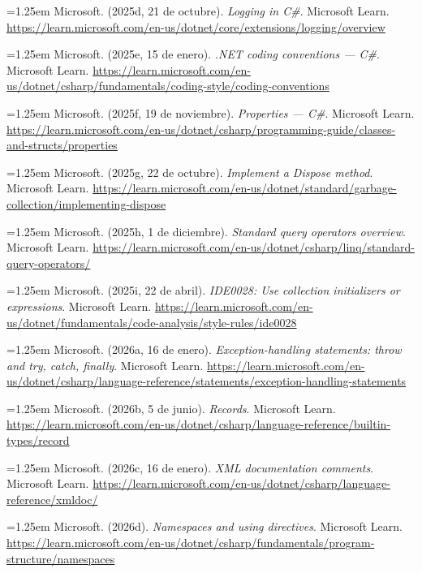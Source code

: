 \smallskip
\noindent\hangindent=1.25em Microsoft. (2025d, 21 de octubre). \textit{Logging in C\#}. Microsoft Learn. \url{https://learn.microsoft.com/en-us/dotnet/core/extensions/logging/overview}

\smallskip
\noindent\hangindent=1.25em Microsoft. (2025e, 15 de enero). \textit{.NET coding conventions --- C\#}. Microsoft Learn. \url{https://learn.microsoft.com/en-us/dotnet/csharp/fundamentals/coding-style/coding-conventions}

\smallskip
\noindent\hangindent=1.25em Microsoft. (2025f, 19 de noviembre). \textit{Properties --- C\#}. Microsoft Learn. \url{https://learn.microsoft.com/en-us/dotnet/csharp/programming-guide/classes-and-structs/properties}

\smallskip
\noindent\hangindent=1.25em Microsoft. (2025g, 22 de octubre). \textit{Implement a Dispose method}. Microsoft Learn. \url{https://learn.microsoft.com/en-us/dotnet/standard/garbage-collection/implementing-dispose}

\smallskip
\noindent\hangindent=1.25em Microsoft. (2025h, 1 de diciembre). \textit{Standard query operators overview}. Microsoft Learn. \url{https://learn.microsoft.com/en-us/dotnet/csharp/linq/standard-query-operators/}

\smallskip
\noindent\hangindent=1.25em Microsoft. (2025i, 22 de abril). \textit{IDE0028: Use collection initializers or expressions}. Microsoft Learn. \url{https://learn.microsoft.com/en-us/dotnet/fundamentals/code-analysis/style-rules/ide0028}

\smallskip
\noindent\hangindent=1.25em Microsoft. (2026a, 16 de enero). \textit{Exception-handling statements: throw and try, catch, finally}. Microsoft Learn. \url{https://learn.microsoft.com/en-us/dotnet/csharp/language-reference/statements/exception-handling-statements}

\smallskip
\noindent\hangindent=1.25em Microsoft. (2026b, 5 de junio). \textit{Records}. Microsoft Learn. \url{https://learn.microsoft.com/en-us/dotnet/csharp/language-reference/builtin-types/record}

\smallskip
\noindent\hangindent=1.25em Microsoft. (2026c, 16 de enero). \textit{XML documentation comments}. Microsoft Learn. \url{https://learn.microsoft.com/en-us/dotnet/csharp/language-reference/xmldoc/}

\smallskip
\noindent\hangindent=1.25em Microsoft. (2026d). \textit{Namespaces and using directives}. Microsoft Learn. \url{https://learn.microsoft.com/en-us/dotnet/csharp/fundamentals/program-structure/namespaces}

